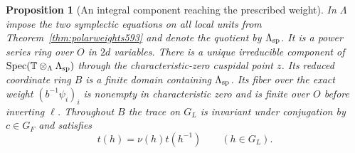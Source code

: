 \documentclass[a4paper,11pt]{article}
\newtheorem{proposition}{Proposition}[section]
\theoremstyle{definition}
\theoremstyle{remark}
\numberwithin{equation}{section}
\begin{document}
\begin{proposition}[An integral component reaching the prescribed weight]
\leavevmode\label{prop:horizontal596}
In \(\Lambda\) impose the two symplectic equations on all
local units from Theorem~\ref{thm:polarweights593} and denote
the quotient by \(\Lambda_{\rm sp}\). It is a power series
ring over \(O\) in \(2d\) variables.
There is a unique irreducible component of
\(\operatorname{Spec}(\mathbb T\otimes_\Lambda\Lambda_{\rm sp})\)
through the characteristic-zero cuspidal point \(z\).
Its reduced coordinate ring \(B\) is a finite domain
containing \(\Lambda_{\rm sp}\). Its fiber over the
exact weight \((b^{-1}\psi_i)_i\) is nonempty in
characteristic zero and is finite over \(O\) before
inverting \(\ell\). Throughout \(B\) the trace on \(G_L\)
is invariant under conjugation by \(c\in G_F\) and satisfies
\[
             t(h)=\nu(h)t(h^{-1})\qquad(h\in G_L).
\]
\end{proposition}
\end{document}
